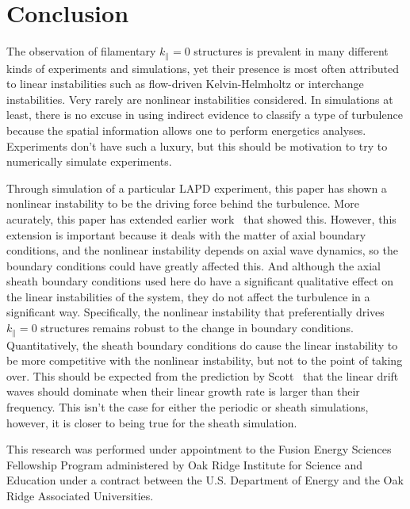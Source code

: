\documentclass[showpacs,preprintnumbers,amsmath,amssymb,superscriptaddress,aip]{revtex4-1}
\def\para{\parallel}
\begin{document}
\section{Conclusion}
\label{conclusion}

The observation of filamentary $k_\para = 0$
structures is prevalent in many different kinds of experiments and simulations, yet their presence is most often attributed to linear instabilities such as flow-driven Kelvin-Helmholtz or interchange
instabilities. Very rarely are nonlinear instabilities considered. In simulations at least, there is no excuse in using indirect evidence to classify a type of turbulence because the spatial
information allows one to perform energetics analyses. Experiments don't have such a luxury, but this should be motivation to try to numerically simulate experiments.

Through simulation of a particular LAPD experiment, this paper has shown a nonlinear instability to be the driving force behind the turbulence. More acurately, this paper has extended
earlier work~\cite{friedman2012b} that showed this. However, this extension is important because it deals with the matter of axial boundary conditions, and the nonlinear instability
depends on axial wave dynamics, so the boundary conditions could have greatly affected this. And although the axial sheath boundary conditions used here do
have a significant qualitative effect on the linear instabilities of the system, they do not affect the turbulence in a significant way.
Specifically, the nonlinear instability that preferentially drives $k_\para = 0$ structures remains robust to the change in boundary conditions. Quantitatively, the sheath boundary conditions
do cause the linear instability to be more competitive with the nonlinear instability, but not to the point of taking over. This should be expected from the prediction by Scott~\cite{scott2005}
that the linear drift waves should dominate when their linear growth rate is larger than their frequency. This isn't the case for either the periodic or sheath simulations, however, it is
closer to being true for the sheath simulation.


\begin{acknowledgments}
This research was performed under appointment to the Fusion Energy Sciences Fellowship Program administered by Oak Ridge Institute for
Science and Education under a contract between the U.S. Department of Energy and the Oak Ridge Associated Universities. 
\end{acknowledgments}
\end{document}
